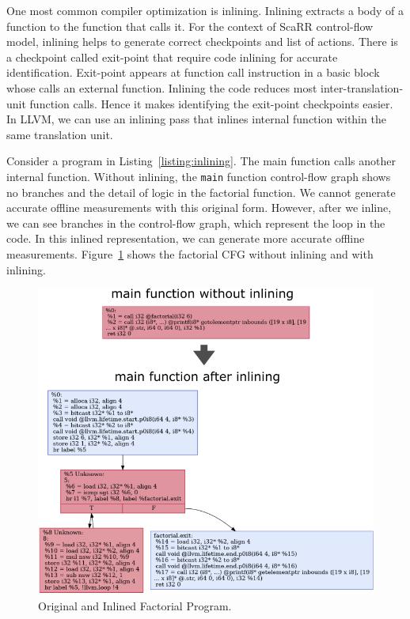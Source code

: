 One most common compiler optimization is inlining. Inlining extracts a body of a
function to the function that calls it. For the context of ScaRR control-flow
model, inlining helps to generate correct checkpoints and list of actions. There
is a checkpoint called exit-point that require code inlining for accurate
identification. Exit-point appears at function call instruction in a basic block
whose calls an external function. Inlining the code reduces most
inter-translation-unit function calls. Hence it makes identifying the exit-point
checkpoints easier.  In LLVM, we can use an inlining pass that inlines internal
function within the same translation unit.

Consider a program in Listing~\ref{listing:inlining}. The main function calls
another internal function. Without inlining, the \texttt{main} function
control-flow graph shows no branches and the detail of logic in the factorial
function. We cannot generate accurate offline measurements with this original
form. However, after we inline, we can see branches in the control-flow graph,
which represent the loop in the code. In this inlined representation, we can
generate more accurate offline measurements. Figure~\ref{fig:inlining} shows the
factorial CFG without inlining and with inlining.


\begin{figure}[h]
    \centerline{\includegraphics[scale=.70]{Figures/04/inlining-function.png}}
    \caption{Original and Inlined Factorial Program.}
    \label{fig:inlining}
\end{figure}

